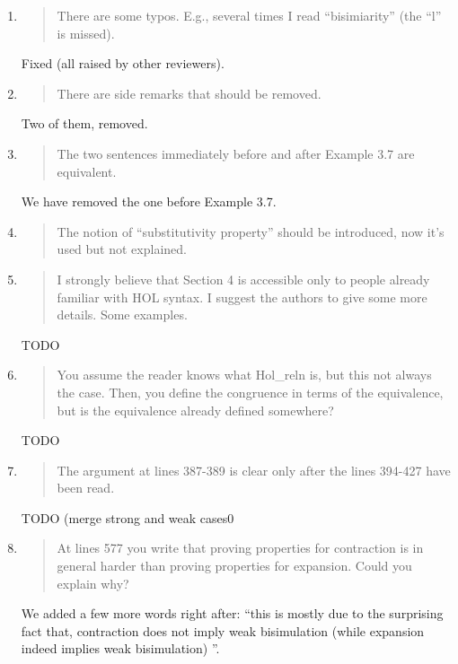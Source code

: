 \begin{enumerate}

\item \begin{quote}
    There are some typos. E.g., several times I read “bisimiarity” (the “l” is missed).
  \end{quote}

  Fixed (all raised by other reviewers).
  
\item \begin{quote}
    There are side remarks that should be removed.
  \end{quote}

  Two of them, removed.
  
\item \begin{quote}
    The two sentences immediately before and after Example 3.7 are equivalent.
  \end{quote}

  We have removed the one before Example 3.7.

\item \begin{quote}
    The notion of “substitutivity property” should be introduced, now it’s used but not explained.
  \end{quote}

\item \begin{quote}
    I strongly believe that Section 4 is accessible only to people
    already familiar with HOL syntax. I suggest the authors to give
    some more details. Some examples.
  \end{quote}

  TODO
  
\item \begin{quote}
    You assume the reader knows what Hol_reln is, but this not always the case. 
Then, you define the congruence in terms of the equivalence, but is
the equivalence already defined somewhere?
  \end{quote}

  TODO
  
\item \begin{quote}
    The argument at lines 387-389 is clear only after the lines 394-427 have been read.
  \end{quote}

  TODO (merge strong and weak cases0
  
\item \begin{quote}
    At lines 577 you write that proving properties for contraction is
    in general harder than proving properties for expansion. Could you
    explain why?
  \end{quote}

  We added a few more words right after: ``this is mostly due to the surprising fact
that, contraction does not imply weak bisimulation (while expansion
indeed implies weak bisimulation) ''.

\end{enumerate}

